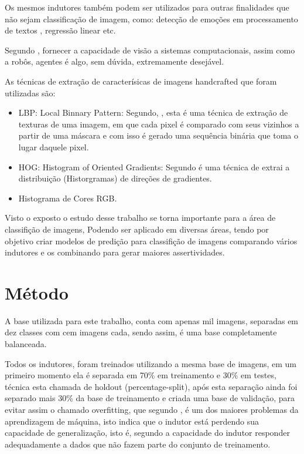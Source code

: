 \documentclass[
article,			%
11pt,				%
oneside,			%
a4paper,			%
english,			%
brazil,				%
sumario=tradicional,
]{abntex2}
\begin{document}
	Os mesmos indutores também podem ser utilizados para outras finalidades que não sejam classificação de imagem, como: detecção de emoções em processamento de textos , regressão linear etc.
	
	Segundo , fornecer a capacidade de visão a sistemas computacionais, assim como a robôs, agentes é algo, sem dúvida, extremamente desejável.
	
	As técnicas de extração de caracterísicas de imagens handcrafted que foram utilizadas são: 
	
	\begin{itemize}
		\item LBP: Local Binnary Pattern: Segundo, , esta é uma técnica de extração de texturas de uma imagem, em que cada pixel é comparado com seus vizinhos a partir de uma máscara e com isso é gerado uma sequência binária que toma o lugar daquele pixel. 
		\item HOG: Histogram of Oriented Gradients: Segundo  é uma técnica de extrai a distribuição (Historgramas) de direções de gradientes.
		\item Histograma de Cores RGB.
	\end{itemize}
	
	
	
	Visto o exposto o estudo desse trabalho se torna importante para a área de classifição de imagens, Podendo ser aplicado em diversas áreas, tendo por objetivo criar modelos de predição para classifição de imagens comparando vários indutores e os combinando para gerar maiores assertividades.
	
	
	\section{Método}
	
	
	A base utilizada para este trabalho, conta com apenas mil imagens, separadas em dez classes com cem imagens cada, sendo assim, é uma base completamente balanceada.
	
	Todos os indutores, foram treinados utilizando a mesma base de imagens, em um primeiro momento ela é separada em 70\%  em treinamento e 30\% em testes, técnica esta chamada de holdout (percentage-split), após esta separação ainda foi separado mais 30\% da base de treinamento e criada uma base de validação, para evitar assim o chamado overfitting, que segundo , é um dos maiores problemas da aprendizagem de máquina, isto indica que o indutor está perdendo sua capacidade de generalização, isto é, segundo  a capacidade do indutor responder adequadamente a dados que não fazem parte do conjunto de treinamento.
	
\end{document}
